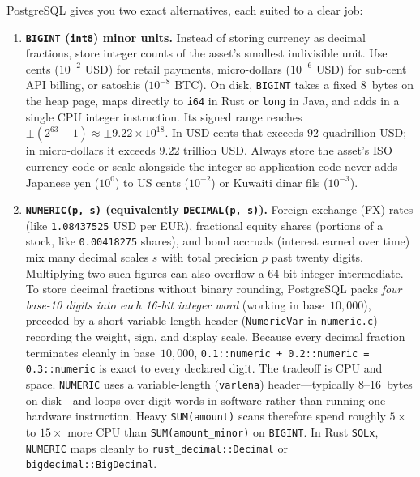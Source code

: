 PostgreSQL gives you two exact alternatives, each suited to a clear job:

\begin{enumerate}
  \item \textbf{\texttt{BIGINT} (\texttt{int8}) minor units.} Instead of storing
    currency as decimal fractions, store integer counts of the asset's smallest
    indivisible unit. Use cents ($10^{-2}\text{ USD}$) for retail payments,
    micro-dollars ($10^{-6}\text{ USD}$) for sub-cent API billing, or satoshis
    ($10^{-8}\text{ BTC}$). On disk, \texttt{BIGINT} takes a fixed 8~bytes on the
    heap page, maps directly to \texttt{i64} in Rust or \texttt{long} in Java, and
    adds in a single CPU integer instruction. Its signed range reaches
    $\pm(2^{63}-1) \approx \pm 9.22 \times 10^{18}$. In USD cents that exceeds
    $92\text{ quadrillion USD}$; in micro-dollars it exceeds $9.22\text{ trillion USD}$.
    Always store the asset's ISO currency code or scale alongside the integer so
    application code never adds Japanese yen ($10^{0}$) to US cents ($10^{-2}$) or
    Kuwaiti dinar fils ($10^{-3}$).
  \item \textbf{\texttt{NUMERIC(p, s)} (equivalently \texttt{DECIMAL(p, s)}).}
    Foreign-exchange (FX) rates (like \texttt{1.08437525} USD per EUR), fractional equity shares
    (portions of a stock, like \texttt{0.00418275} shares), and bond accruals (interest earned over time) mix many decimal scales $s$
    with total precision $p$ past twenty digits. Multiplying two such figures can
    also overflow a 64-bit integer intermediate. To store decimal fractions without
    binary rounding, PostgreSQL packs \emph{four base-10 digits into each 16-bit
    integer word} (working in base~$10{,}000$), preceded by a short variable-length
    header (\texttt{NumericVar} in \texttt{numeric.c}) recording the weight, sign,
    and display scale. Because every decimal fraction terminates cleanly in
    base~$10{,}000$, \texttt{0.1::numeric + 0.2::numeric = 0.3::numeric} is exact
    to every declared digit. The tradeoff is CPU and space. \texttt{NUMERIC} uses a
    variable-length (\texttt{varlena}) header---typically 8--16~bytes on disk---and
    loops over digit words in software rather than running one hardware instruction.
    Heavy \texttt{SUM(amount)} scans therefore spend roughly $5\times$ to $15\times$
    more CPU than \texttt{SUM(amount\_minor)} on \texttt{BIGINT}. In Rust
    \texttt{SQLx}, \texttt{NUMERIC} maps cleanly to \texttt{rust\_decimal::Decimal}
    or \texttt{bigdecimal::BigDecimal}.
\end{enumerate}

